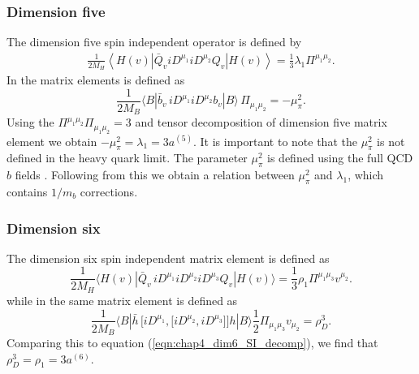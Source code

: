 \subsubsection{Dimension five}\label{subsec:dim5_HQET_SI}
\vspace{-0.2cm}
The dimension five spin independent operator is defined by \cite{Mannel:1994kv}
\begin{eqnarray}
\frac{1}{2 M_{H}}\left\langle H(v)\left|\bar{Q}_{v} i D^{\mu_{1}} i D^{\mu_{2}} Q_{v}\right| H(v)\right\rangle=\frac{1}{3} \lambda_{1} \Pi^{\mu_{1} \mu_{2}}.
\end{eqnarray}
In  \cite{Mannel:2010wj} the matrix elements is defined as 
\begin{equation}
\dfrac1{2M_B}\langle B|\bar b_v\, iD^{\mu_1}iD^{\mu_2}b_v|B\rangle\,\Pi_{\mu_1\mu_2}=-\mu_\pi^2.
\end{equation}
Using the $\Pi^{\mu_1\mu_2}\Pi_{\mu_1\mu_2}=3$ and tensor decomposition of dimension five matrix element we obtain $-\mu_\pi^2=\lambda_1=3a^{(5)}$. It is important to note that the $\mu_{\pi}^2$ is not defined in the heavy quark limit. The parameter $\mu_{\pi}^2$ is defined using the full QCD $b$ fields \cite{Mannel:2010wj}. Following from this we obtain a relation between $\mu_{\pi}^2$ and $\lambda_1$, which contains $1/m_b$ corrections.
\vspace{-0.3cm}
\subsubsection{Dimension six}
\vspace{-0.3cm}
The dimension six spin independent matrix element is defined as \cite{Mannel:1994kv}
\begin{equation}
\dfrac1{2M_H}\langle H(v)|\bar Q_v\, iD^{\mu_1}iD^{\mu_2}iD^{\mu_3}Q_v|H(v)\rangle=\dfrac13\rho_1\Pi^{\mu_1\mu_3}v^{\mu_2}.
\end{equation}
while in  \cite{Mannel:2010wj} the same matrix element is defined as
\begin{equation}
\dfrac1{2M_B}\langle B|\bar h\, \Big[iD^{\mu_1},\big[iD^{\mu_2},iD^{\mu_3}\big]\Big]h|B\rangle\dfrac12\Pi_{\mu_1\mu_3}v_{\mu_2}=\rho_D^3.
\end{equation}
Comparing this to equation (\ref{eqn:chap4_dim6_SI_decomp}), we find that $\rho_D^3=\rho_1=3a^{(6)}$. 
\vspace{-0.4cm}
